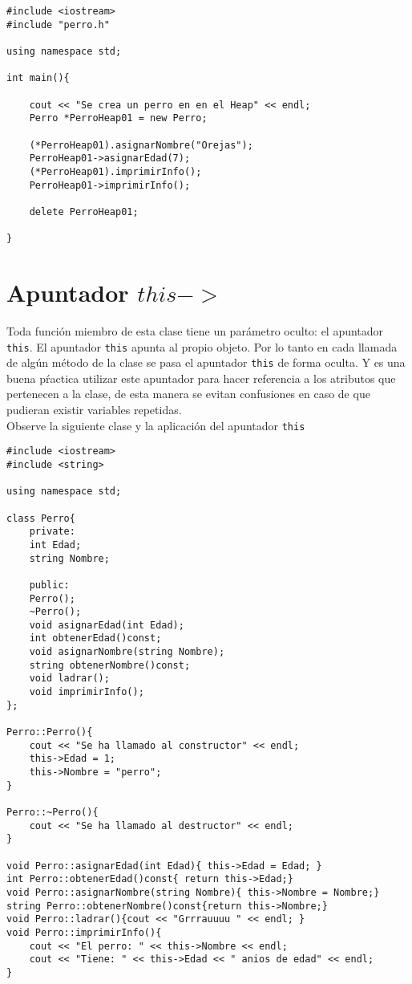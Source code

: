 \documentclass[12pt]{extarticle}
\newcommand{\<}{\langle}
\renewcommand{\>}{\rangle}
\theoremstyle{definition}
\begin{document}
\begin{lstlisting}
#include <iostream>
#include "perro.h"

using namespace std;

int main(){
	
	cout << "Se crea un perro en en el Heap" << endl; 
	Perro *PerroHeap01 = new Perro;
	
	(*PerroHeap01).asignarNombre("Orejas");
	PerroHeap01->asignarEdad(7);
	(*PerroHeap01).imprimirInfo();
	PerroHeap01->imprimirInfo();
	
	delete PerroHeap01;
	
}
\end{lstlisting}



\section{Apuntador $this  ->$}

Toda función miembro de esta clase tiene un parámetro oculto: el apuntador \verb|this|. El apuntador \verb|this| apunta al propio objeto. Por lo tanto en cada llamada de algún método de la clase se pasa el apuntador \verb|this| de forma oculta. Y es una buena pŕactica utilizar este apuntador para hacer referencia a los atributos que pertenecen a la clase, de esta manera se evitan confusiones en caso de que pudieran existir variables repetidas.\\

Observe la siguiente clase y la aplicación del apuntador \verb|this| 

\begin{lstlisting}
#include <iostream>
#include <string>

using namespace std;

class Perro{
	private:
	int Edad;
	string Nombre;
	
	public:
	Perro();
	~Perro();
	void asignarEdad(int Edad);
	int obtenerEdad()const;
	void asignarNombre(string Nombre);
	string obtenerNombre()const;
	void ladrar();
	void imprimirInfo();
};

Perro::Perro(){
	cout << "Se ha llamado al constructor" << endl;
	this->Edad = 1;
	this->Nombre = "perro";
}

Perro::~Perro(){
	cout << "Se ha llamado al destructor" << endl; 
}

void Perro::asignarEdad(int Edad){ this->Edad = Edad; }
int Perro::obtenerEdad()const{ return this->Edad;}
void Perro::asignarNombre(string Nombre){ this->Nombre = Nombre;}
string Perro::obtenerNombre()const{return this->Nombre;}
void Perro::ladrar(){cout << "Grrrauuuu " << endl; }
void Perro::imprimirInfo(){
	cout << "El perro: " << this->Nombre << endl; 
	cout << "Tiene: " << this->Edad << " anios de edad" << endl;
}
\end{lstlisting}
\end{document}
